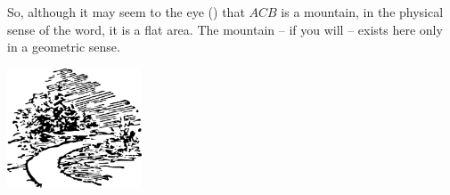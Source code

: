 So, although it may seem to the eye () that $ACB$ is a mountain, in the physical sense of the word, it is a flat area. The mountain -- if you will -- exists here only in a geometric sense.


\begin{center}
\includegraphics[width=0.3\textwidth]{figures/ch-04/fig-ch-04-tail.pdf}
\end{center}


















